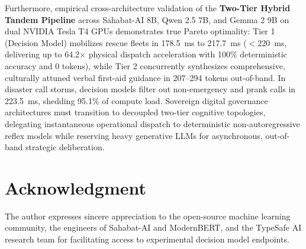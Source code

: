 \documentclass[journal,compsoc]{IEEEtran}
\begin{document}
Furthermore, empirical cross-architecture validation of the \textbf{Two-Tier Hybrid Tandem Pipeline} across Sahabat-AI 8B, Qwen 2.5 7B, and Gemma 2 9B on dual NVIDIA Tesla T4 GPUs demonstrates true Pareto optimality: Tier 1 (Decision Model) mobilizes rescue fleets in 178.5~ms to 217.7~ms ($<$220~ms, delivering up to 64.2$\times$ physical dispatch acceleration with 100\% deterministic accuracy and 0 tokens), while Tier 2 concurrently synthesizes comprehensive, culturally attuned verbal first-aid guidance in 207--294 tokens out-of-band. In disaster call storms, decision models filter out non-emergency and prank calls in 223.5~ms, shedding 95.1\% of compute load. Sovereign digital governance architectures must transition to decoupled two-tier cognitive topologies, delegating instantaneous operational dispatch to deterministic non-autoregressive reflex models while reserving heavy generative LLMs for asynchronous, out-of-band strategic deliberation.

\section*{Acknowledgment}
The author expresses sincere appreciation to the open-source machine learning community, the engineers of Sahabat-AI and ModernBERT, and the TypeSafe AI research team for facilitating access to experimental decision model endpoints.
\end{document}
